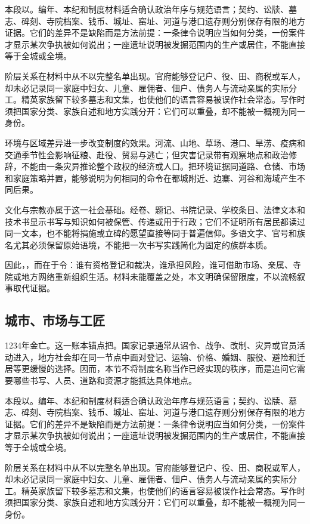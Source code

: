 本段以。编年、本纪和制度材料适合确认政治年序与规范语言；契约、讼牍、墓志、碑刻、寺院档案、钱币、城址、窑址、河道与港口遗存则分别保存有限的地方证据。它们的差异不是缺陷而是方法前提：一条律令说明应当如何分类，一份案件才显示某次争执被如何说出；一座遗址说明被发掘范围内的生产或居住，不能直接等于全城或全境。

阶层关系在材料中从不以完整名单出现。官府能够登记户、役、田、商税或军人，却未必记录同一家庭中妇女、儿童、雇佣者、佃户、债务人与流动亲属的实际分工。精英家族留下较多墓志和文集，也使他们的语言容易被误作社会常态。写作时须把国家分类、家族自述和地方实践分开：它们可以重叠，却不能被一概视为同一身份。

环境与区域差异进一步改变制度的效果。河流、山地、草场、港口、旱涝、疫病和交通季节性会影响征粮、赴役、贸易与逃亡；但灾害记录带有观察地点和政治修辞，不能由一条灾异推论整个政权的经济或人口。把环境证据同道路、仓储、市场和家庭策略并置，能够说明为何相同的命令在都城附近、边寨、河谷和海域产生不同后果。

文化与宗教亦属于这一社会基础。经卷、题记、书院记录、学校条目、法律文本和技术书显示书写与知识如何被保管、传递或用于行政；它们不证明所有居民都读过同一文本，也不能将捐施或立碑的愿望直接等同于普遍信仰。多语文字、官号和族名尤其必须保留原始语境，不能把一次书写实践简化为固定的族群本质。

因此，，而在于令：谁有资格登记和裁决，谁承担风险，谁可借助市场、亲属、寺院或地方网络重新组织生活。材料未能覆盖之处，本文明确保留限度，不以流畅叙事取代证据。

\subsection{城市、市场与工匠}

1234年金亡。这一账本锚点把。国家记录通常从诏令、战争、改制、灾异或官员活动进入，地方社会却在同一节点中面对登记、运输、价格、婚姻、服役、避险和迁居等更缓慢的选择。因而，本节不将制度名称当作已经实现的秩序，而是追问它需要哪些书写、人员、道路和资源才能抵达具体地点。

本段以。编年、本纪和制度材料适合确认政治年序与规范语言；契约、讼牍、墓志、碑刻、寺院档案、钱币、城址、窑址、河道与港口遗存则分别保存有限的地方证据。它们的差异不是缺陷而是方法前提：一条律令说明应当如何分类，一份案件才显示某次争执被如何说出；一座遗址说明被发掘范围内的生产或居住，不能直接等于全城或全境。

阶层关系在材料中从不以完整名单出现。官府能够登记户、役、田、商税或军人，却未必记录同一家庭中妇女、儿童、雇佣者、佃户、债务人与流动亲属的实际分工。精英家族留下较多墓志和文集，也使他们的语言容易被误作社会常态。写作时须把国家分类、家族自述和地方实践分开：它们可以重叠，却不能被一概视为同一身份。

